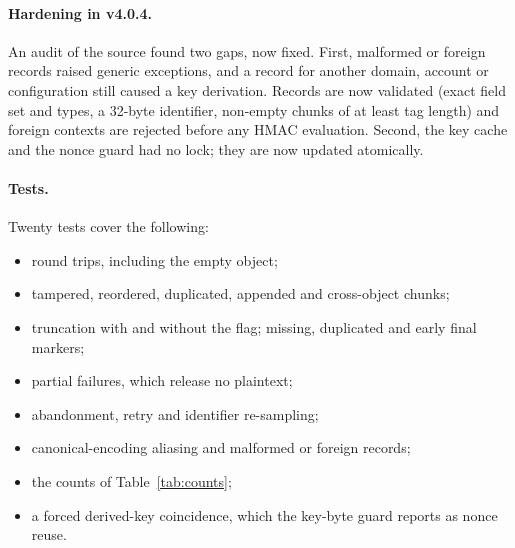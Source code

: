 \documentclass[pdflatex,sn-mathphys-num]{sn-jnl}
\theoremstyle{plain}
\theoremstyle{definition}
\begin{document}
\paragraph{Hardening in v4.0.4.}
An audit of the source found two gaps, now fixed. First, malformed or foreign records raised generic exceptions, and a record for another domain, account or configuration still caused a key derivation. Records are now validated (exact field set and types, a 32-byte identifier, non-empty chunks of at least tag length) and foreign contexts are rejected before any HMAC evaluation. Second, the key cache and the nonce guard had no lock; they are now updated atomically.

\paragraph{Tests.}
Twenty tests cover the following:
\begin{itemize}
\item round trips, including the empty object;
\item tampered, reordered, duplicated, appended and cross-object chunks;
\item truncation with and without the flag; missing, duplicated and early final markers;
\item partial failures, which release no plaintext;
\item abandonment, retry and identifier re-sampling;
\item canonical-encoding aliasing and malformed or foreign records;
\item the counts of Table~\ref{tab:counts};
\item a forced derived-key coincidence, which the key-byte guard reports as nonce reuse.
\end{itemize}
\end{document}
